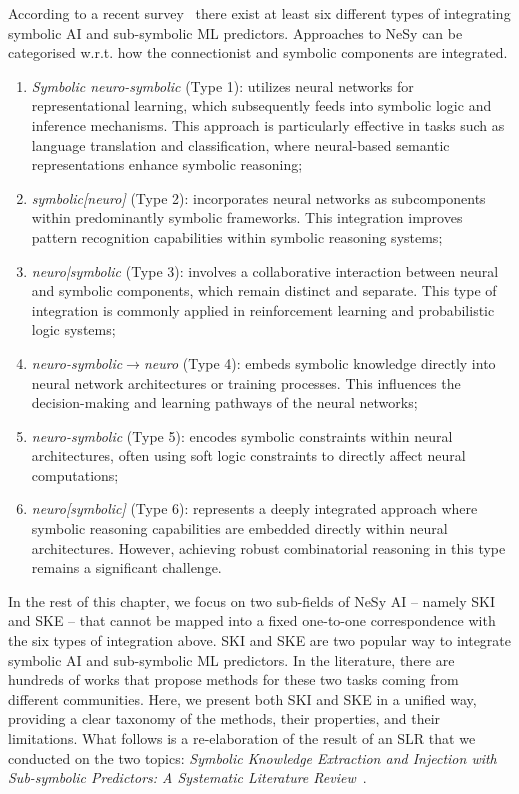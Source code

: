 According to a recent survey~\cite{DBLP:journals/nca/BhuyanRTS24} there exist at least six different types of integrating symbolic \gls{AI} and sub-symbolic \gls{ML} predictors.
%
Approaches to \gls{NeSy} can be categorised w.r.t. how the connectionist and symbolic components are integrated.
%
\begin{enumerate}
    \item \emph{Symbolic neuro-symbolic} (Type 1): utilizes neural networks for representational learning, which subsequently feeds into symbolic logic and inference mechanisms.
    This approach is particularly effective in tasks such as language translation and classification, where neural-based semantic representations enhance symbolic reasoning;
    \item \emph{symbolic[neuro]} (Type 2): incorporates neural networks as subcomponents within predominantly symbolic frameworks.
    This integration improves pattern recognition capabilities within symbolic reasoning systems;
    \item \emph{neuro|symbolic} (Type 3): involves a collaborative interaction between neural and symbolic components, which remain distinct and separate.
    This type of integration is commonly applied in reinforcement learning and probabilistic logic systems;
    \item \emph{neuro-symbolic$\rightarrow$neuro} (Type 4): embeds symbolic knowledge directly into neural network architectures or training processes.
    This influences the decision-making and learning pathways of the neural networks;
    \item \emph{neuro-symbolic} (Type 5): encodes symbolic constraints within neural architectures, often using soft logic constraints to directly affect neural computations;
    \item \emph{neuro[symbolic]} (Type 6): represents a deeply integrated approach where symbolic reasoning capabilities are embedded directly within neural architectures.
    However, achieving robust combinatorial reasoning in this type remains a significant challenge.
\end{enumerate}

In the rest of this chapter, we focus on two sub-fields of \gls{NeSy} \gls{AI} -- namely \gls{SKI} and \gls{SKE} -- that cannot be mapped into a fixed one-to-one correspondence with the six types of integration above.
%
\Gls{SKI} and \gls{SKE} are two popular way to integrate symbolic \gls{AI} and sub-symbolic \gls{ML} predictors.
%
In the literature, there are hundreds of works that propose methods for these two tasks coming from different communities.
%
Here, we present both \gls{SKI} and \gls{SKE} in a unified way, providing a clear taxonomy of the methods, their properties, and their limitations.
%
What follows is a re-elaboration of the result of an \gls{SLR} that we conducted on the two topics: \emph{Symbolic Knowledge Extraction and Injection with Sub-symbolic Predictors: A Systematic Literature Review}~\cite{DBLP:journals/csur/CiattoSAMO24}.
%


